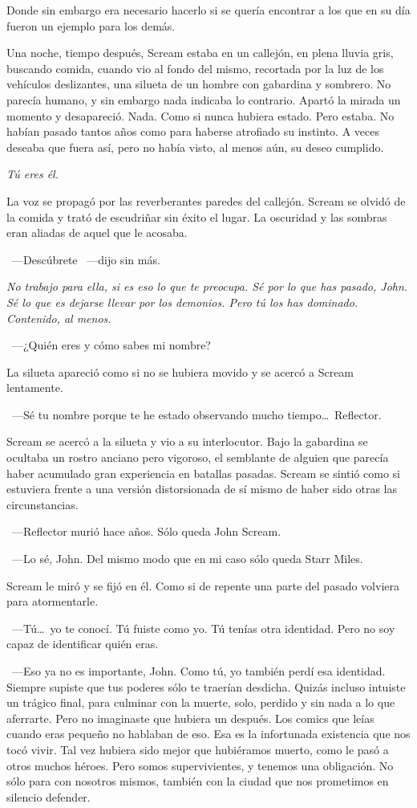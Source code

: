 Donde sin embargo era necesario hacerlo si se quería encontrar a los que en su día fueron un ejemplo para los demás.

\bigskip\noindent
Una noche, tiempo después, Scream estaba en un callejón, en plena lluvia gris, buscando comida, cuando vio al fondo del mismo, recortada por la luz de los vehículos deslizantes, una silueta de un hombre con gabardina y sombrero. No parecía humano, y sin embargo nada indicaba lo contrario. Apartó la mirada un momento y desapareció. Nada. Como si nunca hubiera estado. Pero estaba. No habían pasado tantos años como para haberse atrofiado su instinto. A veces deseaba que fuera así, pero no había visto, al menos aún, su deseo cumplido.

\emph{Tú eres él.}

La voz se propagó por las reverberantes paredes del callejón. Scream se olvidó de la comida y trató de escudriñar sin éxito el lugar. La oscuridad y las sombras eran aliadas de aquel que le acosaba.

~---Descúbrete ~---dijo sin más.

\emph{No trabajo para ella, si es eso lo que te preocupa. Sé por lo que has pasado, John. Sé lo que es dejarse llevar por los demonios. Pero tú los has dominado. Contenido, al menos.}

~---¿Quién eres y cómo sabes mi nombre?

La silueta apareció como si no se hubiera movido y se acercó a Scream lentamente.

~---Sé tu nombre porque te he estado observando mucho tiempo\dots\ Reflector.

Scream se acercó a la silueta y vio a su interlocutor. Bajo la gabardina se ocultaba un rostro anciano pero vigoroso, el semblante de alguien que parecía haber acumulado gran experiencia en batallas pasadas. Scream se sintió como si estuviera frente a una versión distorsionada de sí mismo de haber sido otras las circunstancias.

~---Reflector murió hace años. Sólo queda John Scream.

~---Lo sé, John. Del mismo modo que en mi caso sólo queda Starr Miles.

Scream le miró y se fijó en él. Como si de repente una parte del pasado volviera para atormentarle.

~---Tú\dots\ yo te conocí. Tú fuiste como yo. Tú tenías otra identidad. Pero no soy capaz de identificar quién eras.

~---Eso ya no es importante, John. Como tú, yo también perdí esa identidad. Siempre supiste que tus poderes sólo te traerían desdicha. Quizás incluso intuiste un trágico final, para culminar con la muerte, solo, perdido y sin nada a lo que aferrarte. Pero no imaginaste que hubiera un después. Los comics que leías cuando eras pequeño no hablaban de eso. Esa es la infortunada existencia que nos tocó vivir. Tal vez hubiera sido mejor que hubiéramos muerto, como le pasó a otros muchos héroes. Pero somos supervivientes, y tenemos una obligación. No sólo para con nosotros mismos, también con la ciudad que nos prometimos en silencio defender.

